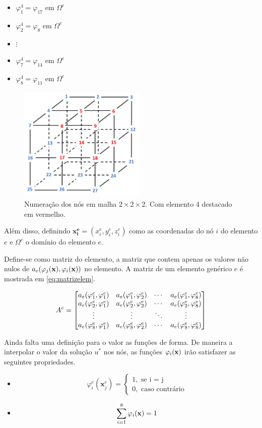 \begin{itemize}
   \item $\varphi^4_1=\varphi_{17}$ em $\Omega^e$   
   \item $\varphi^4_2=\varphi_{8}$ em $\Omega^e$  
   \item $\vdots$
   \item $\varphi^4_7=\varphi_{14}$ em $\Omega^e$  
   \item $\varphi^4_8=\varphi_{11}$ em $\Omega^e$ 
\end{itemize}



\begin{figure}[!htbp]
\label{fig:grid2x2_elem3_vermelho}
\centering
\includegraphics[width=6cm]{chap01/grid2x2_elem3_vermelho.png}
\caption{Numeração dos nós em malha $2\times2\times2$. Com elemento 4 destacado em vermelho.}
\end{figure}


Além disso, definindo $\mathbf{x^e_i} = (x^e_i, y^e_i, z^e_i)$ como as coordenadas do nó $i$ do elemento $e$ e $\Omega^e$ o domínio do elemento $e$.



Define-se como matriz do elemento, a matriz que contem apenas os valores não nulos de $a_e(\varphi_j(\mathbf{x}),\varphi_i(\mathbf{x}))$ no elemento. A matriz de um elemento genérico $e$ é mostrada em \ref{eq:matrizelem}.

\begin{equation}
\label{eq:matrizelem}
A^e = \begin{bmatrix} a_e(\varphi^e_{1}, \varphi^e_{1}) & a_e(\varphi^e_{1}, \varphi^e_{2}) & \cdots & a_e(\varphi^e_{1}, \varphi^e_{8}) \\ a_e(\varphi^e_{2}, \varphi^e_{1}) & a_e(\varphi^e_{2}, \varphi^e_{2}) & \cdots & a_e(\varphi^e_{2}, \varphi^e_{8}) \\ \vdots & \vdots & \ddots & \vdots \\ a_e(\varphi^e_{8}, \varphi^e_{1}) & a_e(\varphi^e_{8}, \varphi^e_{2}) & \cdots & a_e(\varphi^e_{8}, \varphi^e_{8}) \\ \end{bmatrix}
\end{equation}


Ainda falta uma definição para o valor as funções de forma. De maneira a interpolar o valor da solução $u^*$ nos nós, as funções $\varphi_i(\mathbf{x})$ irão satisfazer as seguintes propriedades.

\begin{itemize}
\item \begin{equation}\label{eq:func_cond1}
\varphi^e_i(\mathbf{x}^e_j) = \left\{\begin{matrix} 1, \text{ se i = j} \\  0, \text{ caso contrário} \end{matrix}\right.
\end{equation}
\item \begin{equation}\label{eq:func_cond2}
    \sum_{i=1}^8 \varphi_i(\mathbf{x}) = 1
\end{equation}
\end{itemize}


